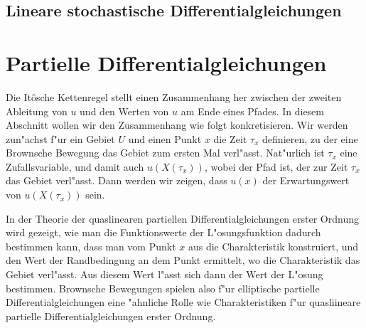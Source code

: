 \subsection{Lineare stochastische Differentialgleichungen}

%
%
\section{Partielle Differentialgleichungen\label{section:pdgl}}
Die It\^osche Kettenregel stellt einen Zusammenhang her zwischen der zweiten
Ableitung von $u$ und den Werten von $u$ am Ende eines Pfades.
In diesem Abschnitt wollen wir den Zusammenhang wie folgt konkretisieren.
Wir werden zun"achst f"ur ein Gebiet $U$ und einen Punkt $x$ die
Zeit $\tau_x$ definieren, zu der eine Brownsche Bewegung das Gebiet zum
ersten Mal verl"asst.
Nat"urlich ist $\tau_x$ eine Zufallsvariable, und damit auch $u(X(\tau_x))$,
wobei der Pfad ist, der zur Zeit $\tau_x$ das Gebiet verl"asst.
Dann werden wir zeigen, dass $u(x)$ der Erwartungswert von $u(X(\tau_x))$
sein.

In der Theorie der quaslinearen partiellen Differentialgleichungen erster
Ordnung wird gezeigt, wie man die Funktionswerte der L"osungsfunktion
dadurch bestimmen kann, dass man vom Punkt $x$ aus die Charakteristik 
konstruiert, und den Wert der Randbedingung an dem Punkt ermittelt,
wo die Charakteristik das Gebiet verl"asst.
Aus diesem Wert l"asst sich dann der Wert der L"osung bestimmen.
Brownsche Bewegungen spielen also f"ur elliptische partielle
Differentialgleichungen eine "ahnliche Rolle wie Charakteristiken f"ur
quasliineare partielle Differentialgleichungen erster Ordnung.


